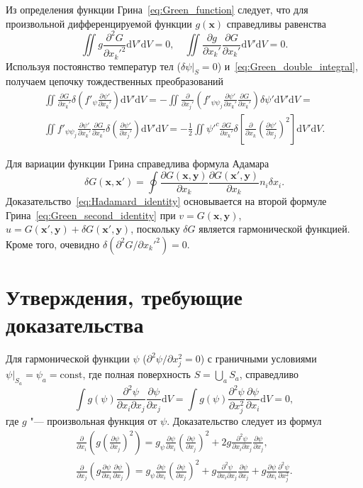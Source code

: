 \documentclass{article}
\theoremstyle{plain}
\newcommand{\dd}{\mathrm{d}}
\newcommand{\pder}[2][]{\frac{\partial#1}{\partial#2}}
\newcommand{\pderdual}[2][]{\frac{\partial^2#1}{\partial#2^2}}
\newcommand{\pderder}[3][]{\frac{\partial^2#1}{\partial#2\partial#3}}
\newcommand{\Pderdual}[2][]{\partial^2#1/\partial#2^2}
\newcommand{\bx}{\boldsymbol{x}}
\newcommand{\by}{\boldsymbol{y}}
\begin{document}
Из определения функции Грина~\eqref{eq:Green_function} следует,
что для произвольной дифференцируемой функции \(g(\bx)\) справедливы равенства
\begin{equation}\label{eq:Green_double_integral}
    \iint g\pderdual[G]{x_k'}\dd{V'}\dd{V} = 0, \quad
    \iint \pder[g]{x_k'}\pder[G]{x_k'}\dd{V'}\dd{V} = 0.
\end{equation}
Используя постоянство температур тел (\(\delta\psi|_S=0\)) и~\eqref{eq:Green_double_integral},
получаем цепочку тождественных преобразований
\begin{multline}\label{eq:variation_energy3}
    \iint \pder[G]{x_k'}\delta\left( f'_\psi\pder[\psi']{x_k'} \right) \dd{V'}\dd{V} =
    -\iint \pder{x_j'}\left( f'_{\psi\psi_j}\pder[\psi']{x_k'}\pder[G]{x_k'} \right)\delta\psi' \dd{V'}\dd{V} = \\
    \iint f'_{\psi\psi_j}\pder[\psi']{x_k'}\pder[G]{x_k'} \delta\left(\pder[\psi']{x_j'}\right) \dd{V'}\dd{V} =
    -\frac12\iint \psi'^c\pder[G]{x_k'} \delta\left[\pder{x_k}\left(\pder[\psi']{x_j}\right)^2\right] \dd{V'}\dd{V}.
\end{multline}

Для вариации функции Грина справедлива формула Адамара~\cite{Hadamard1908, Schiffer1958}
\begin{equation}\label{eq:Hadamard_identity}
    \delta{G}(\bx,\bx') = \oint\pder[G(\bx,\by)]{x_k}\pder[G(\bx',\by)]{x_k} n_i\delta{x_i}.
\end{equation}
Доказательство~\eqref{eq:Hadamard_identity} основывается на второй формуле Грина~\eqref{eq:Green_second_identity}
при \(v=G(\bx,\by)\), \(u=G(\bx',\by)+\delta{G}(\bx',\by)\), поскольку \(\delta{G}\) является гармонической функцией.
Кроме того, очевидно \(\delta(\Pderdual[G]{x_k'}) = 0\).

\section{Утверждения, требующие доказательства}

Для гармонической функции \(\psi\) (\(\Pderdual[\psi]{x_j} = 0\)) с граничными условиями
\(\psi|_{S_a} = \psi_a = \mathrm{const}\), где полная поверхность \(S=\bigcup_a S_a\), справедливо
\begin{equation}\label{eq:integral_mixed}
    \int g(\psi)\pderder[\psi]{x_i}{x_j}\pder[\psi]{x_j}\dd{V} = \int g(\psi)\pderdual[\psi]{x_j}\pder[\psi]{x_i}\dd{V} = 0,
\end{equation}
где \(g\) "--- произвольная функция от \(\psi\). Доказательство следует из формул
\begin{gather}
    \pder{x_i}\left( g \left(\pder[\psi]{x_j}\right)^2 \right) =
        g_\psi\pder[\psi]{x_i}\left(\pder[\psi]{x_j}\right)^2 + 2g\pderder[\psi]{x_i}{x_j}\pder[\psi]{x_j}, \\
    \pder{x_j}\left( g \pder[\psi]{x_i}\pder[\psi]{x_j} \right) =
        g_\psi\pder[\psi]{x_i}\left(\pder[\psi]{x_j}\right)^2 + g\pderder[\psi]{x_i}{x_j}\pder[\psi]{x_j} +
        g\pder[\psi]{x_i}\pderdual[\psi]{x_j}.
\end{gather}
\end{document}
